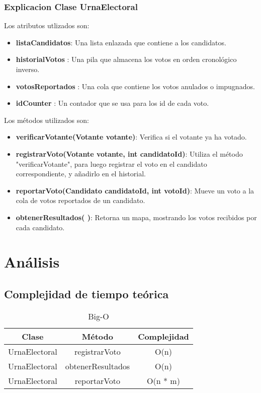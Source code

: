 \documentclass[12pt]{article}
\begin{document}
\subsubsection{Explicacion Clase UrnaElectoral}

Los atributos utlizados son: 
\begin{itemize}
    \item \textbf{listaCandidatos}: Una lista enlazada que contiene a los candidatos.
    \item \textbf{historialVotos }: Una pila que almacena los votos en orden cronológico inverso.
    \item \textbf{votosReportados }: Una cola que contiene los votos anulados o impugnados.
    \item \textbf{idCounter }: Un contador que se usa para los id de cada voto.


\end{itemize}

Los métodos utilizados son:
\begin{itemize}
    \item \textbf{verificarVotante(Votante votante)}: Verifica si el votante ya ha votado.
    \item \textbf{registrarVoto(Votante votante, int candidatoId)}: Utiliza el método "verificarVotante", para luego registrar el voto en el candidato correspondiente, y añadirlo en el historial.
    \item \textbf{reportarVoto(Candidato candidatoId, int votoId)}: Mueve un voto a la cola de votos reportados de un candidato. 
    \item \textbf{obtenerResultados( )}: Retorna un mapa, mostrando los votos recibidos por cada candidato.

\end{itemize}

\pagebreak

\section{Análisis}
\subsection{Complejidad de tiempo teórica}



\begin{table}[h]
    \centering
    \begin{tabular}{|c|c|c|}
        \hline
        Clase& Método& Complejidad\\ \hline
        UrnaElectoral& registrarVoto& O(n)\\ \hline
        UrnaElectoral& obtenerResultados& O(n)\\ \hline
        UrnaElectoral& reportarVoto& O(n * m)\\ \hline
    \end{tabular}
    \caption{ Big-O}
    \label{tab:placeholder_label}
\end{table}
\end{document}

